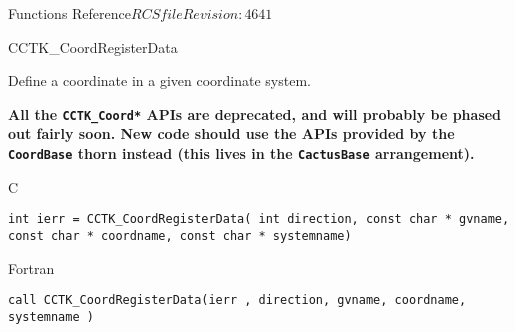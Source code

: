 \begin{cactuspart}{ Functions Reference}{$RCSfile$}{$Revision: 4641 $}

\begin{FunctionDescription}{CCTK\_CoordRegisterData}%
{Define a coordinate in a given coordinate system.

\textbf{All the \texttt{CCTK\_Coord*} APIs are deprecated,
and will probably be phased out fairly soon.
New code should use the APIs provided by the \texttt{CoordBase} thorn
instead (this lives in the \texttt{CactusBase} arrangement).}
}
\label{CCTK-CoordRegisterData}
\begin{SynopsisSection}
\begin{Synopsis}{C}
\begin{verbatim}int ierr = CCTK_CoordRegisterData( int direction, const char * gvname, const char * coordname, const char * systemname)\end{verbatim}
\end{Synopsis}
\begin{Synopsis}{Fortran}
\begin{verbatim}call CCTK_CoordRegisterData(ierr , direction, gvname, coordname, systemname )


\end{verbatim}
\end{Synopsis}
\end{SynopsisSection}
\end{FunctionDescription}
\end{cactuspart}
